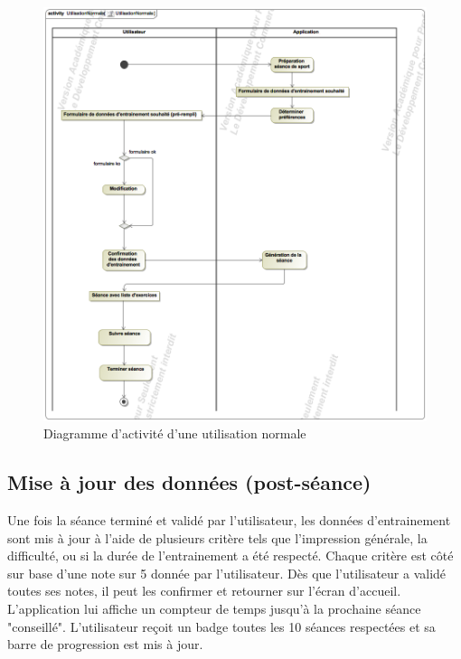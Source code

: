 \newpage

\begin{figure}[!h]
\includegraphics[scale=0.3]{diagrams/utilisation}
\centering
\caption{Diagramme d'activité d'une utilisation normale}
\end{figure}


\subsection*{Mise à jour des données (post-séance)}

Une fois la séance terminé et validé par l'utilisateur, les données d'entrainement sont mis à jour à l'aide de plusieurs critère tels que l'impression générale, la difficulté, ou si la durée de l'entrainement a été respecté. Chaque critère est côté sur base d'une note sur 5 donnée par l'utilisateur. Dès que l'utilisateur a validé toutes ses notes, il peut les confirmer et retourner sur l'écran d'accueil. L'application lui affiche un compteur de temps jusqu'à la prochaine séance "conseillé". L'utilisateur reçoit un badge toutes les 10 séances respectées et sa barre de progression est mis à jour.  

